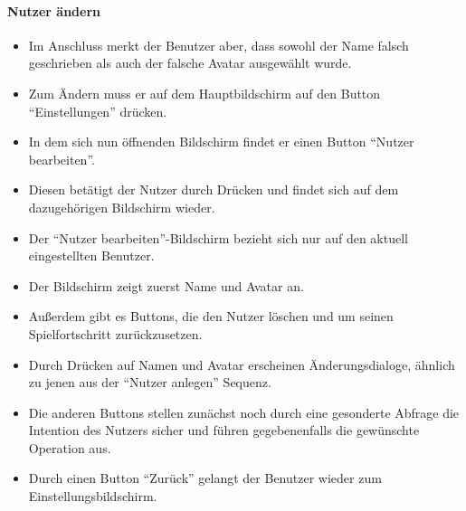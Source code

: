 \paragraph{Nutzer ändern}
\begin{itemize}
\item Im Anschluss merkt der Benutzer aber, dass sowohl der Name falsch geschrieben
als auch der falsche Avatar ausgewählt wurde.
\item Zum Ändern muss er auf dem Hauptbildschirm auf den Button "`Einstellungen"' drücken.
\item In dem sich nun öffnenden Bildschirm findet er einen Button "`Nutzer bearbeiten"'.
\item Diesen betätigt der Nutzer durch Drücken und findet sich auf dem dazugehörigen
Bildschirm wieder. 
\item Der "`Nutzer bearbeiten"'-Bildschirm bezieht sich nur auf den aktuell eingestellten Benutzer.
\item Der Bildschirm zeigt zuerst Name und Avatar an.
\item Außerdem gibt es Buttons, die den Nutzer löschen und um seinen Spielfortschritt
zurückzusetzen. 
\item Durch Drücken auf Namen und Avatar erscheinen Änderungsdialoge,
ähnlich zu jenen aus der "`Nutzer anlegen"' Sequenz.
\item Die anderen Buttons stellen zunächst noch durch eine gesonderte Abfrage die Intention des 
Nutzers sicher und führen gegebenenfalls die gewünschte Operation aus.
\item Durch einen Button "`Zurück"' gelangt der Benutzer wieder zum Einstellungsbildschirm.
\end{itemize}
